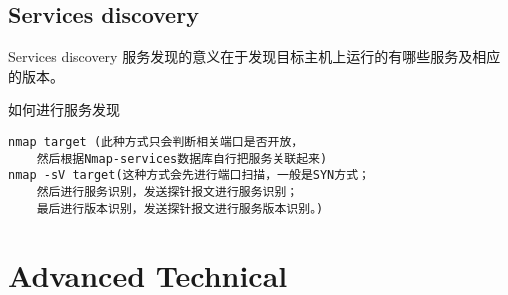 \documentclass{beamer}
\begin{document}
\subsection{Services discovery}
\begin{frame}
\end{frame}
\begin{frame}[fragile]{Services discovery}
服务发现的意义在于发现目标主机上运行的有哪些服务及相应的版本。
\begin{block}{如何进行服务发现}
\begin{verbatim}
nmap target (此种方式只会判断相关端口是否开放，
    然后根据Nmap-services数据库自行把服务关联起来)
nmap -sV target(这种方式会先进行端口扫描，一般是SYN方式；
    然后进行服务识别，发送探针报文进行服务识别；
    最后进行版本识别，发送探针报文进行服务版本识别。)
\end{verbatim}
\end{block}
\end{frame}

\section{Advanced Technical}
\begin{frame}
\end{frame}
\end{document}

